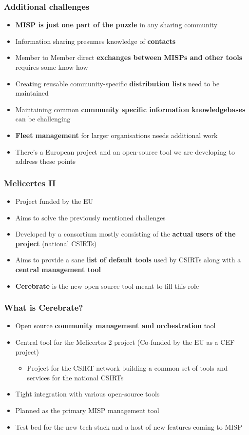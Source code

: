 \begin{frame}
\frametitle{Additional challenges}
\begin{itemize}
	\item {\bf MISP is just one part of the puzzle} in any sharing community
	\item Information sharing presumes knowledge of {\bf contacts}
	\item Member to Member direct {\bf exchanges between MISPs and other tools} requires some know how
	\item Creating reusable community-specific {\bf distribution lists} need to be maintained
	\item Maintaining common {\bf community specific information knowledgebases} can be challenging
	\item {\bf Fleet management} for larger organisations needs additional work
        \item There's a European project and an open-source tool we are developing to address these points
\end{itemize}
\end{frame}

\begin{frame}
\frametitle{Melicertes II}
\begin{itemize}
	\item Project funded by the EU
	\item Aims to solve the previously mentioned challenges
	\item Developed by a consortium mostly consisting of the {\bf actual users of the project} (national CSIRTs)
	\item Aims to provide a sane {\bf list of default tools} used by CSIRTs along with a {\bf central management tool}
	\item {\bf Cerebrate} is the new open-source tool meant to fill this role
\end{itemize}
\end{frame}

\begin{frame}
	\frametitle{What is Cerebrate?}
	\begin{itemize}
                \item Open source {\bf community management and orchestration} tool
                \item Central tool for the Melicertes 2 project (Co-funded by the EU as a CEF project)
                \begin{itemize}
                    \item Project for the CSIRT network building a common set of tools and services for the national CSIRTs
                \end{itemize}
                \item Tight integration with various open-source tools
                \item Planned as the primary MISP management tool
                \item Test bed for the new tech stack and a host of new features coming to MISP
	\end{itemize}
\end{frame}

